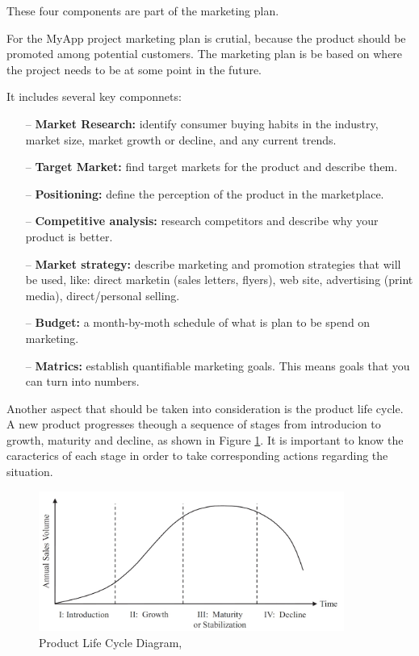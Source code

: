 These four components are part of the marketing plan.

For the MyApp project marketing plan is crutial, because the product should be promoted among potential customers. The marketing plan is be based on where the project needs to be at some point in the future.

It includes several key componnets: 
\begin{enumerate}

\item[--] \textbf{Market Research:} identify consumer buying habits in the industry, market size, market growth or decline, and any current trends.

\item[--] \textbf{Target Market:} find target markets for the product and describe them.

\item[--] \textbf{Positioning:} define the perception of the product in the marketplace.

\item[--] \textbf{Competitive analysis:} research competitors and describe why your product is better.

\item[--] \textbf{Market strategy:} describe marketing and promotion strategies that will be used, like: direct marketin (sales letters, flyers), web site, advertising (print media), direct/personal selling.

\item[--] \textbf{Budget:} a month-by-moth schedule of what is plan to be spend on marketing.

\item[--] \textbf{Matrics:} establish quantifiable marketing goals. This means goals that you can turn into numbers.

\end{enumerate}

Another aspect that should be taken into consideration is the product life cycle. A new product progresses theough a sequence of stages from introducion to growth, maturity and decline, as shown in Figure \ref{product-stage}. It is important to know the caracterics of each stage in order to take corresponding actions regarding the situation.

\begin{figure}[!ht]
\centering
\includegraphics[width=10cm]{product-life-cycle}
\caption{Product Life Cycle Diagram, \cite{prodcutFigure}}\label{product-stage}
\end{figure}

